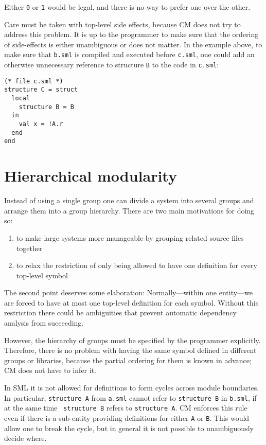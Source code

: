 \documentclass{article}
\begin{document}
Either {\tt 0} or {\tt 1} would be legal, and there is no way to
prefer one over the other.

Care must be taken with top-level side effects, because CM does not
try to address this problem.  It is up to the programmer to make sure
that the ordering of side-effects is either unambiguous or does not
matter.  In the example above, to make sure that {\tt b.sml} is
compiled and executed before {\tt c.sml}, one could add an otherwise
unnecessary reference to structure {\tt B} to the code in {\tt c.sml}:

\begin{verbatim}
(* file c.sml *)
structure C = struct
  local
    structure B = B
  in
    val x = !A.r
  end
end
\end{verbatim}

\section{Hierarchical modularity}

Instead of using a single group one can divide a system into several
groups and arrange them into a group hierarchy.  There are two main
motivations for doing so:
{\samepage
\begin{enumerate}
\item to make large systems more manageable by grouping related source
files together
\item to relax the restriction of only being allowed to have one
definition for every top-level symbol
\end{enumerate}
}
The second point deserves some elaboration: Normally---within one
entity---we are forced to have at most one top-level definition for
each symbol.  Without this restriction there could be ambiguities that
prevent automatic dependency analysis from succeeding.

However, the hierarchy of groups must be specified by the programmer
explicitly. Therefore, there is no problem with having the same symbol
defined in different groups or libraries, because the partial ordering
for them is known in advance; CM does not have to infer it.

In SML it is not allowed for definitions to form cycles across module
boundaries.  In particular, {\tt structure A} from {\tt a.sml} cannot
refer to {\tt structure B} in {\tt b.sml}, if at the same time {\tt
structure B} refers to {\tt structure A}.  CM enforces this rule even
if there is a sub-entity providing definitions for either {\tt A} or
{\tt B}.  This would allow one to break the cycle, but in general it is
not possible to unambiguously decide where.
\end{document}
